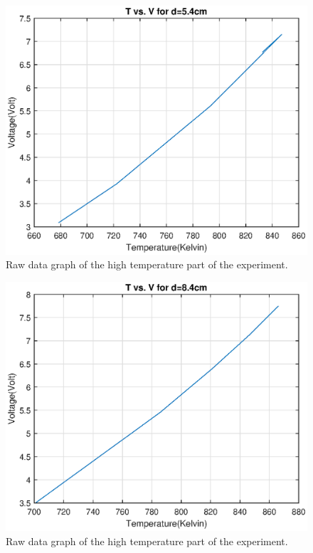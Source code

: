 \documentclass[11pt,a4paper]{article}
\begin{document}
{\begin{center}
\begin{figure}[H]
\begin{center}
		\includegraphics[scale=0.7]{5.eps}
	\end{center}
	\caption{Raw data graph of the high temperature part of the experiment.}
\end{figure}\begin{figure}[H]
\begin{center}
	\includegraphics[scale=0.7]{8.eps}
\end{center}
\caption{Raw data graph of the high temperature part of the experiment.}
\end{figure}
\begin{figure}[H]

\end{figure}
\end{center}}
\end{document}
